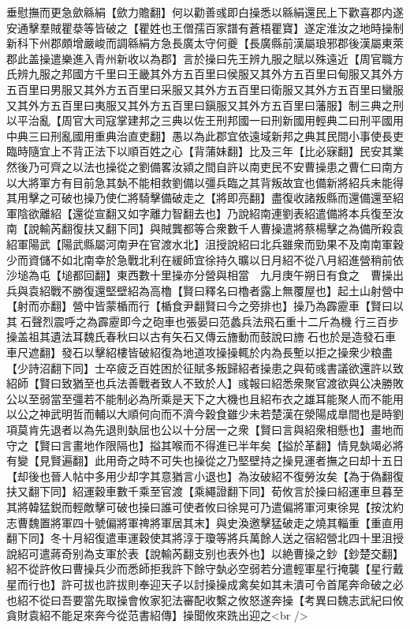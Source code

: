 垂慰撫而更急歛緜絹【歛力贍翻】何以勸善彧即白操悉以緜絹還民上下歡喜郡内遂安通擊羣賊瞿㳟等皆破之【瞿姓也王僧孺百家譜有蒼梧瞿寶】遂定淮汝之地時操制新科下州郡頗增嚴峻而調緜絹方急長廣太守何夔【長廣縣前漢屬琅邪郡後漢屬東萊郡此盖操遣樂進入青州新收以為郡】言於操曰先王辨九服之賦以殊遠近【周官職方氏辨九服之邦國方千里曰王畿其外方五百里曰侯服又其外方五百里曰甸服又其外方五百里曰男服又其外方五百里曰采服又其外方五百里曰衛服又其外方五百里曰蠻服又其外方五百里曰夷服又其外方五百里曰鎭服又其外方五百里曰藩服】制三典之刑以平治亂【周官大司寇掌建邦之三典以佐王刑邦國一曰刑新國用輕典二曰刑平國用中典三曰刑亂國用重典治直吏翻】愚以為此郡宜依遠域新邦之典其民間小事使長吏臨時隨宜上不背正法下以順百姓之心【背蒲妹翻】比及三年【比必寐翻】民安其業然後乃可齊之以法也操從之劉備畧汝潁之間自許以南吏民不安曹操患之曹仁曰南方以大將軍方有目前急其埶不能相救劉備以彊兵臨之其背叛故宜也備新將紹兵未能得其用擊之可破也操乃使仁將騎擊備破走之【將即亮翻】盡復收諸叛縣而還備還至紹軍陰欲離紹【還從宣翻又如字離力智翻去也】乃說紹南連劉表紹遣備將本兵復至汝南【說輸芮翻復扶又翻下同】與賊龔都等合衆數千人曹操遣將蔡楊擊之為備所殺袁紹軍陽武【陽武縣屬河南尹在官渡水北】沮授說紹曰北兵雖衆而勁果不及南南軍穀少而資儲不如北南幸於急戰北利在緩師宜徐持久曠以日月紹不從八月紹進營稍前依沙塠為屯【塠都回翻】東西數十里操亦分營與相當　九月庚午朔日有食之　曹操出兵與袁紹戰不勝復還堅壁紹為高櫓【賢曰釋名曰櫓者露上無覆屋也】起土山射營中【射而亦翻】營中皆蒙楯而行【楯食尹翻賢曰今之旁排也】操乃為霹靂車【賢曰以其石聲烈震呼之為霹靂即今之砲車也張晏曰范蠡兵法飛石重十二斤為機行三百步操盖祖其遺法耳魏氏春秋曰以古有矢石又傳云旝動而鼓說曰旝石也於是造發石車車尺遮翻】發石以擊紹樓皆破紹復為地道攻操操輒於内為長塹以拒之操衆少粮盡【少詩沼翻下同】士卒疲乏百姓困於征賦多叛歸紹者操患之與荀彧書議欲還許以致紹師【賢曰致猶至也兵法善戰者致人不致於人】彧報曰紹悉衆聚官渡欲與公决勝敗公以至弱當至彊若不能制必為所乘是天下之大機也且紹布衣之雄耳能聚人而不能用以公之神武明哲而輔以大順何向而不濟今穀食雖少未若楚漢在滎陽成臯間也是時劉項莫肯先退者以為先退則埶屈也公以十分居一之衆【賢曰言與紹衆相懸也】畫地而守之【賢曰言畫地作限隔也】搤其喉而不得進已半年矣【搤於革翻】情見埶竭必將有變【見賢遍翻】此用奇之時不可失也操從之乃堅壁持之操見運者撫之曰却十五日【却後也晉人帖中多用少却字其意猶言小退也】為汝破紹不復勞汝矣【為于偽翻復扶又翻下同】紹運穀車數千乘至官渡【乘繩證翻下同】荀攸言於操曰紹運車旦暮至其將韓猛鋭而輕敵擊可破也操曰誰可使者攸曰徐晃可乃遣偏將軍河東徐晃【按沈約志曹魏置將軍四十號偏將軍禆將軍居其末】與史渙邀擊猛破走之燒其輜重【重直用翻下同】冬十月紹復遣車運穀使其將淳于瓊等將兵萬餘人送之宿紹營北四十里沮授說紹可遣蔣奇别為支軍於表【說輸芮翻支别也表外也】以絶曹操之鈔【鈔楚交翻】紹不從許攸曰曹操兵少而悉師拒我許下餘守埶必空弱若分遣輕軍星行掩襲【星行戴星而行也】許可拔也許拔則奉迎天子以討操操成禽矣如其未潰可令首尾奔命破之必也紹不從曰吾要當先取操會攸家犯法審配收繫之攸怒遂奔操【考異曰魏志武紀曰攸貪財袁紹不能足來奔今從范書紹傳】操聞攸來跣出迎之<br />
